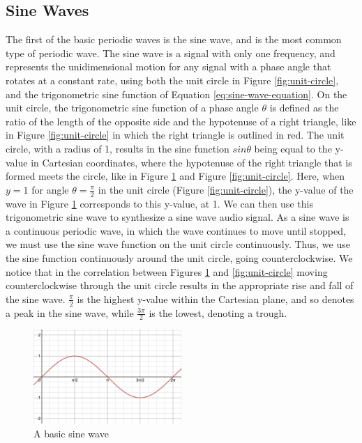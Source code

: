 \subsection{Sine Waves}\label{subsection:sine-waves}
The first of the basic periodic waves is the sine wave, and is the most common type of periodic wave. The sine wave is a signal with only one frequency, and represents the unidimensional motion for any signal with a phase angle that rotates at a constant rate, using both the unit circle in Figure \ref{fig:unit-circle}, and the trigonometric sine function of Equation \ref{eq:sine-wave-equation}. On the unit circle, the trigonometric sine function of a phase angle $\theta$ is defined as the ratio of the length of the opposite side and the hypotenuse of a right triangle, like in Figure \ref{fig:unit-circle} in which the right triangle is outlined in red. The unit circle, with a radius of 1, results in the sine function $sin\theta$ being equal to the y-value in Cartesian coordinates, where the hypotenuse of the right triangle that is formed meets the circle, like in Figure \ref{fig:basic-sine-wave} and Figure \ref{fig:unit-circle}. Here, when $y = 1$ for angle  $\theta = \frac{\pi}{2}$ in the unit circle (Figure \ref{fig:unit-circle}), the y-value of the wave in Figure \ref{fig:basic-sine-wave} corresponds to this y-value, at 1. We can then use this trigonometric sine wave to synthesize a sine wave audio signal. As a sine wave is a continuous periodic wave, in which the wave continues to move until stopped, we must use the sine wave function on the unit circle continuously. Thus, we use the sine function continuously around the unit circle, going counterclockwise. We notice that in the correlation between Figures \ref{fig:basic-sine-wave} and \ref{fig:unit-circle} moving counterclockwise through the unit circle results in the appropriate rise and fall of the sine wave. $\frac{\pi}{2}$ is the highest y-value within the Cartesian plane, and so denotes a peak in the sine wave, while $\frac{3\pi}{2}$ is the lowest, denoting a trough.

\begin{figure}[h]
	\centering
	\includegraphics[width=0.5\textwidth]{figures/sine-wave-form.png}
	\caption{A basic sine wave}
	\label{fig:basic-sine-wave}
\end{figure}


